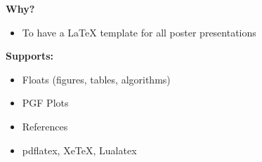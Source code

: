 \textbf{Why?}
\begin{itemize}
    \item To have a LaTeX  template for all poster presentations
\end{itemize}

\hfill \break
\textbf{Supports:}
\begin{itemize}
	\item Floats (figures, tables, algorithms)
	\item PGF Plots
	\item References~\cite{einstein1935}
	\item pdflatex, XeTeX, Lualatex
\end{itemize}
